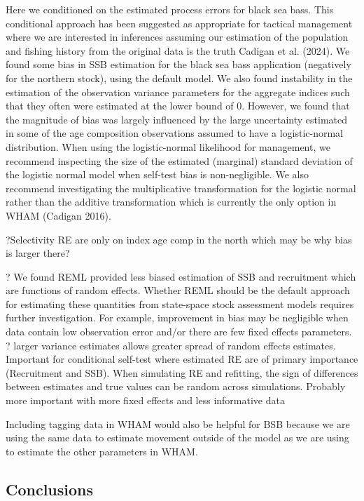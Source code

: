 \documentclass[
]{article}
\begin{document}
Here we conditioned on the estimated process errors for black sea bass.
This conditional approach has been suggested as appropriate for tactical
management where we are interested in inferences assuming our estimation
of the population and fishing history from the original data is the
truth Cadigan et al. (2024). We found some bias in SSB estimation for
the black sea bass application (negatively for the northern stock),
using the default model. We also found instability in the estimation of
the observation variance parameters for the aggregate indices such that
they often were estimated at the lower bound of 0. However, we found
that the magnitude of bias was largely influenced by the large
uncertainty estimated in some of the age composition observations
assumed to have a logistic-normal distribution. When using the
logistic-normal likelihood for management, we recommend inspecting the
size of the estimated (marginal) standard deviation of the logistic
normal model when self-test bias is non-negligible. We also recommend
investigating the multiplicative transformation for the logistic normal
rather than the additive transformation which is currently the only
option in WHAM (Cadigan 2016).

?Selectivity RE are only on index age comp in the north which may be why
bias is larger there?

? We found REML provided less biased estimation of SSB and recruitment
which are functions of random effects. Whether REML should be the
default approach for estimating these quantities from state-space stock
assessment models requires further investigation. For example,
improvement in bias may be negligible when data contain low observation
error and/or there are few fixed effects parameters. ? larger variance
estimates allows greater spread of random effects estimates. Important
for conditional self-test where estimated RE are of primary importance
(Recruitment and SSB). When simulating RE and refitting, the sign of
differences between estimates and true values can be random across
simulations. Probably more important with more fixed effects and less
informative data

Including tagging data in WHAM would also be helpful for BSB because we
are using the same data to estimate movement outside of the model as we
are using to estimate the other parameters in WHAM.

\hypertarget{conclusions}{%
\subsection*{Conclusions}\label{conclusions}}
\end{document}
